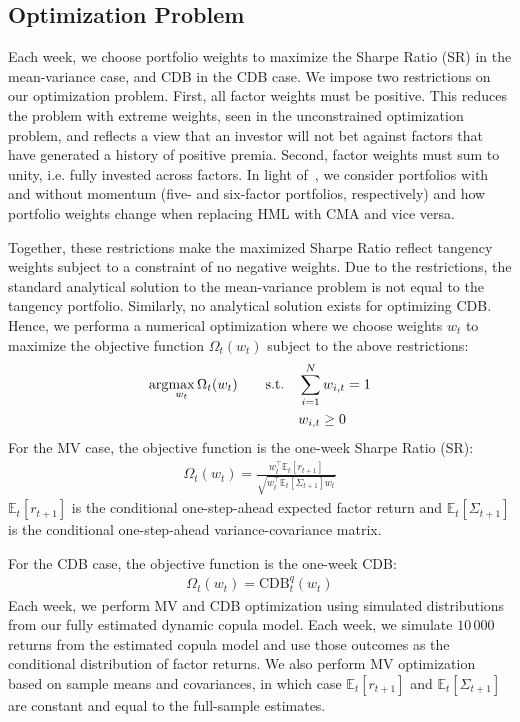 \subsection{Optimization Problem} %
\label{sub:optimization_problem}

Each week, we choose portfolio weights to maximize the Sharpe Ratio (SR) in the mean-variance case, and CDB in the CDB case. We impose two restrictions on our optimization problem. First, all factor weights must be positive. This reduces the problem with extreme weights, seen in the unconstrained optimization problem, and reflects a view that an investor will not bet against factors that have generated a history of positive premia. Second, factor weights must sum to unity, i.e. fully invested across factors. In light of~\textcite{Asness2015}, we consider portfolios with and without momentum (five- and six-factor portfolios, respectively) and how portfolio weights change when replacing HML with CMA and vice versa.

Together, these restrictions make the maximized Sharpe Ratio reflect tangency weights subject to a constraint of no negative weights. Due to the restrictions, the standard analytical solution to the mean-variance problem is not equal to the tangency portfolio. Similarly, no analytical solution exists for optimizing CDB. Hence, we performa a numerical optimization where we choose weights $w_t$ to maximize the objective function $\Omega_t(w_t)$ subject to the above restrictions:
\begin{align}
  \arg\!\max_{w_t} \Omega_t(w_t)
    &&\text{\quad s.t.\quad} & \sum_{i=1}^N w_{i,t} = 1 \\
    &&                       & w_{i,t} \ge 0 \notag
\end{align}
For the MV case, the objective function is the one-week Sharpe Ratio (SR):
\begin{align}
  \Omega_t(w_t) = \frac{w_t^\top \mathbb{E}_t[r_{t+1}]}{\sqrt{w_t^\top \mathbb{E}_t[\Sigma_{t+1}] w_t}}
\end{align}
$\mathbb{E}_t[r_{t+1}]$ is the conditional one-step-ahead expected factor return and $\mathbb{E}_t[\Sigma_{t+1}]$ is the conditional one-step-ahead variance-covariance matrix. 

For the CDB case, the objective function is the one-week CDB:
\begin{align}
  \Omega_t(w_t) = \text{CDB}_t^q(w_t)
\end{align}
Each week, we perform MV and CDB optimization using simulated distributions from our fully estimated dynamic copula model. Each week, we simulate $10\,000$ returns from the estimated copula model and use those outcomes as the conditional distribution of factor returns. We also perform MV optimization based on sample means and covariances, in which case $\mathbb{E}_t[r_{t+1}]$ and $\mathbb{E}_t[\Sigma_{t+1}]$ are constant and equal to the full-sample estimates.


